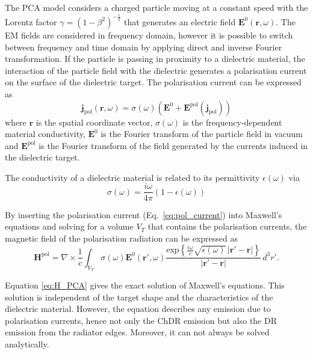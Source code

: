 The PCA model considers a charged particle moving at a constant speed with the Lorentz factor $\gamma = (1-\beta^2)^{-\frac{1}{2}}$ that generates an electric field $\mathbf{E}^0(\mathbf{r}, \omega)$. The EM fields are considered in frequency domain, however it is  possible to switch between frequency and time domain by applying direct and inverse Fourier transformation. If the particle is passing in proximity to a dielectric material, the interaction of the particle field with the dielectric generates a polarisation current on the surface of the dielectric target. The polarisation current can be expressed as
\begin{equation}
\mathbf{j}_\text{pol}(\mathbf{r}, \omega) = \sigma(\omega)\left( \mathbf{E}^0 + \mathbf{E}^\text{pol}(\mathbf{j}_\text{pol}) \right)
\label{eq:pol_current}
\end{equation}
where $\mathbf{r}$ is the spatial coordinate vector, $\sigma(\omega)$ is the frequency-dependent material conductivity, $\mathbf{E}^0$ is the Fourier transform of the particle field in vacuum and $\mathbf{E}^\text{pol}$ is the Fourier transform of the field generated by the currents induced in the dielectric target. 

The conductivity of a dielectric material is related to its permittivity $\epsilon(\omega)$ via
\begin{equation}
\sigma(\omega) = \frac{i\omega}{4\pi} \left( 1- \epsilon(\omega)\right)
\end{equation}

By inserting the polarisation current (Eq.~\ref{eq:pol_current}) into Maxwell's equations and solving for a volume $V_T$ that contains the polarisation currents, the magnetic field of the polarisation radiation can be expressed as~\cite{Karlovets:2009su, Shevelev:2014doa}
\begin{equation}
\mathbf{H}^\text{pol} = \nabla \times \frac{1}{c} \int_{V_T} \sigma(\omega) \mathbf{E}^0(\mathbf{r'}, \omega) \frac{\text{exp} \left\{ \frac{i\omega}{c} \sqrt{\epsilon(\omega)} \, |\mathbf{r'}- \mathbf{r}|  \right\}}{|\mathbf{r'}- \mathbf{r}|} \, d^3r' \label{eq:H_PCA}.
\end{equation}

\noindent Equation \ref{eq:H_PCA} gives the exact solution of  Maxwell's equations. This solution is independent of the target shape and the characteristics of the dielectric material. However, the equation describes any emission due to polarisation currents, hence not only the ChDR emission but also the DR emission from the radiator edges. Moreover, it can not always be solved analytically.

